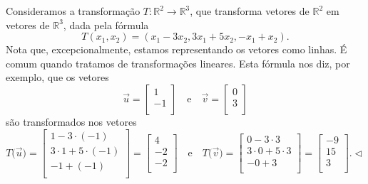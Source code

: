 \begin{ex}\label{exp:7}
Consideramos a transformação $T: \mathbb{R}^2 \to \mathbb{R}^3$, que transforma vetores de $\mathbb{R}^2$ em vetores de $\mathbb{R}^3$, dada pela fórmula
\begin{equation}
T(x_1, x_2) = (x_1 - 3 x_2, 3x_1 + 5x_2, -x_1 + x_2).
\end{equation} Nota que, excepcionalmente, estamos representando os vetores como linhas. É comum quando tratamos de transformações lineares. Esta fórmula nos diz, por exemplo, que os vetores
\begin{equation}
\vec{u} =
\left[
  \begin{array}{c}
    1 \\
    -1 \\
  \end{array}
\right] \quad \text{e} \quad
\vec{v} =
\left[
  \begin{array}{c}
    0 \\
    3 \\
  \end{array}
\right]
\end{equation} são transformados nos vetores
\begin{equation}
T\big(\vec{u}\big) =
\left[
  \begin{array}{c}
    1-3\cdot(-1) \\
    3\cdot 1 + 5\cdot(-1) \\
    -1 + (-1)\\
  \end{array}
\right] =
\left[
  \begin{array}{r}
     4 \\
    -2 \\
    -2 \\
  \end{array}
\right] \quad \text{e} \quad
T\big(\vec{v}\big) =
\left[
  \begin{array}{c}
    0-3\cdot 3 \\
    3\cdot 0 + 5\cdot 3 \\
    -0 + 3 \\
  \end{array}
\right] =
\left[
  \begin{array}{r}
    -9 \\
    15 \\
     3 \\
  \end{array}
\right].\lhd
\end{equation}
\end{ex}




